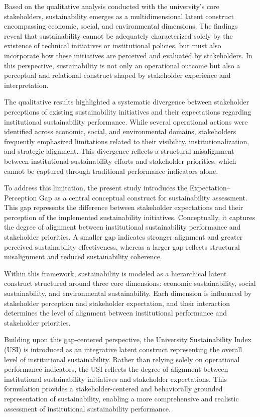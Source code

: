 \documentclass[11pt,a4paper]{article}
\begin{document}
Based on the qualitative analysis conducted with the university’s core stakeholders, sustainability emerges as a multidimensional latent construct encompassing economic, social, and environmental dimensions. The findings reveal that sustainability cannot be adequately characterized solely by the existence of technical initiatives or institutional policies, but must also incorporate how these initiatives are perceived and evaluated by stakeholders. In this perspective, sustainability is not only an operational outcome but also a perceptual and relational construct shaped by stakeholder experience and interpretation.

The qualitative results highlighted a systematic divergence between stakeholder perceptions of existing sustainability initiatives and their expectations regarding institutional sustainability performance. While several operational actions were identified across economic, social, and environmental domains, stakeholders frequently emphasized limitations related to their visibility, institutionalization, and strategic alignment. This divergence reflects a structural misalignment between institutional sustainability efforts and stakeholder priorities, which cannot be captured through traditional performance indicators alone.

To address this limitation, the present study introduces the Expectation--Perception Gap as a central conceptual construct for sustainability assessment. This gap represents the difference between stakeholder expectations and their perception of the implemented sustainability initiatives. Conceptually, it captures the degree of alignment between institutional sustainability performance and stakeholder priorities. A smaller gap indicates stronger alignment and greater perceived sustainability effectiveness, whereas a larger gap reflects structural misalignment and reduced sustainability coherence.

Within this framework, sustainability is modeled as a hierarchical latent construct structured around three core dimensions: economic sustainability, social sustainability, and environmental sustainability. Each dimension is influenced by stakeholder perception and stakeholder expectation, and their interaction determines the level of alignment between institutional performance and stakeholder priorities.

Building upon this gap-centered perspective, the University Sustainability Index (USI) is introduced as an integrative latent construct representing the overall level of institutional sustainability. Rather than relying solely on operational performance indicators, the USI reflects the degree of alignment between institutional sustainability initiatives and stakeholder expectations. This formulation provides a stakeholder-centered and behaviorally grounded representation of sustainability, enabling a more comprehensive and realistic assessment of institutional sustainability performance.
\end{document}
